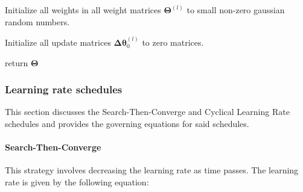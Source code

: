 \documentclass{article}
\begin{document}
\begin{algorithm}
		\SetAlgoLined
		
		Initialize all weights in all weight matrices $\boldsymbol\Theta^{(l)}$ to small non-zero gaussian random numbers.
		
		Initialize all update matrices $\boldsymbol{\Delta\theta}^{(l)}_0$ to zero matrices.
		
	return $\boldsymbol{\Theta}$
\end{algorithm}
\hfill\newpage

\subsubsection{Learning rate schedules}

This section discusses the Search-Then-Converge and Cyclical Learning Rate schedules and provides the governing equations for said schedules.


\paragraph{Search-Then-Converge}
This strategy involves decreasing the learning rate as time passes. The learning rate is given by the following equation:
\end{document}
